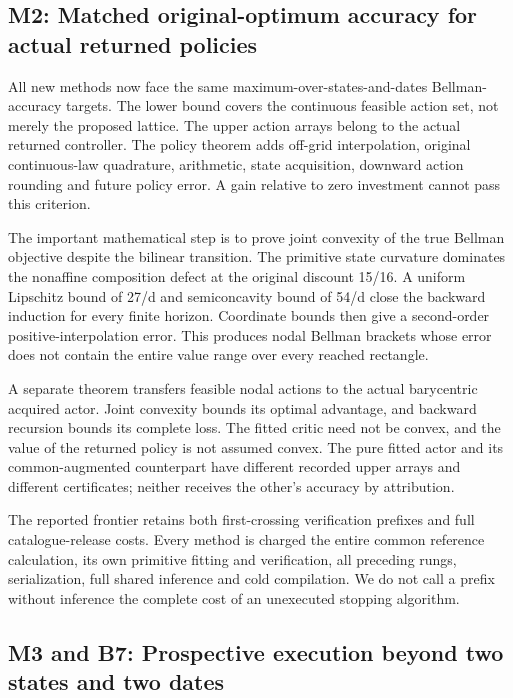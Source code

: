 \documentclass[ecta,nameyear,draft]{econsocart}
\begin{document}
\hypertarget{m2-matched-original-optimum-accuracy-for-actual-returned-policies}{%
\subsection{M2: Matched original-optimum accuracy for actual returned
policies}\label{m2-matched-original-optimum-accuracy-for-actual-returned-policies}}

All new methods now face the same maximum-over-states-and-dates
Bellman-accuracy targets. The lower bound covers the continuous feasible
action set, not merely the proposed lattice. The upper action arrays
belong to the actual returned controller. The policy theorem adds
off-grid interpolation, original continuous-law quadrature, arithmetic,
state acquisition, downward action rounding and future policy error. A
gain relative to zero investment cannot pass this criterion.

The important mathematical step is to prove joint convexity of the true
Bellman objective despite the bilinear transition. The primitive state
curvature dominates the nonaffine composition defect at the original
discount 15/16. A uniform Lipschitz bound of 27/d and semiconcavity
bound of 54/d close the backward induction for every finite horizon.
Coordinate bounds then give a second-order positive-interpolation error.
This produces nodal Bellman brackets whose error does not contain the
entire value range over every reached rectangle.

A separate theorem transfers feasible nodal actions to the actual
barycentric acquired actor. Joint convexity bounds its optimal
advantage, and backward recursion bounds its complete loss. The fitted
critic need not be convex, and the value of the returned policy is not
assumed convex. The pure fitted actor and its common-augmented
counterpart have different recorded upper arrays and different
certificates; neither receives the other's accuracy by attribution.

The reported frontier retains both first-crossing verification prefixes
and full catalogue-release costs. Every method is charged the entire
common reference calculation, its own primitive fitting and
verification, all preceding rungs, serialization, full shared inference
and cold compilation. We do not call a prefix without inference the
complete cost of an unexecuted stopping algorithm.

\hypertarget{m3-and-b7-prospective-execution-beyond-two-states-and-two-dates}{%
\subsection{M3 and B7: Prospective execution beyond two states and two
dates}\label{m3-and-b7-prospective-execution-beyond-two-states-and-two-dates}}
\end{document}
